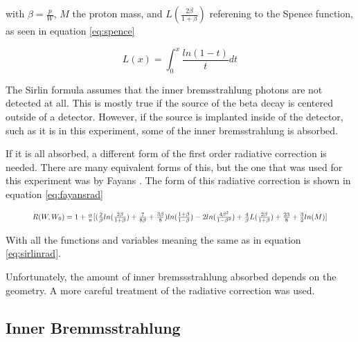 with $\beta = \frac{p}{W}$, $M$ the proton mass, and $L(\frac{2\beta}{1+\beta})$ referening to the Spence function, as seen in equation \ref{eq:spence} \cite{Wil95}

\begin{equation}
	L(x) = \int_{0}^{x} \frac{ln(1 - t)}{t}dt
	\label{eq:spence}
\end{equation}

The Sirlin formula assumes that the inner bremsstrahlung photons are not detected at all.
This is mostly true if the source of the beta decay is centered outside of a detector.
However, if the source is implanted inside of the detector, such as it is in this experiment, some of the inner bremsstrahlung is absorbed.

If it is all absorbed, a different form of the first order radiative correction is needed.
There are many equivalent forms of this, but the one that was used for this experiment was by Fayans \cite{Fay86}.
The form of this radiative correction is shown in equation \ref{eq:fayansrad}

\begin{equation}	
	\resizebox{.9\textwidth}{!}
	{
	$R(W,W_{0}) = 1 + \frac{\alpha}{\pi}[(\frac{2}{\beta}ln(\frac{2\beta}{1+\beta}) + \frac{7}{8\beta} + \frac{3\beta}{8})ln(\frac{1 + \beta}{1 - \beta}) - 2ln(\frac{4\beta^{2}}{1 - \beta^{2}}) + \frac{4}{\beta}L(\frac{2\beta}{1+\beta}) + \frac{23}{8} + \frac{3}{2}ln(M)]$
	}
	\label{eq:fayansrad}
\end{equation}

With all the functions and variables meaning the same as in equation \ref{eq:sirlinrad}.

Unfortunately, the amount of inner bremssstrahlung absorbed depends on the geometry.
A more careful treatment of the radiative correction was used.

\subsection{Inner Bremmsstrahlung}

